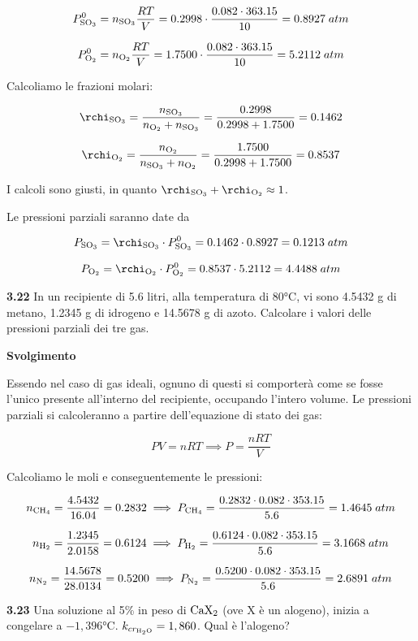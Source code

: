 $$P^0_{\rm SO_3}=n_{\rm SO_3} \displaystyle \frac{RT}{V}
=0.2998 \cdot \frac{0.082 \cdot 363.15}{10}
=0.8927\;atm$$

$$P^0_{\rm O_2}=n_{\rm O_2} \displaystyle \frac{RT}{V}
=1.7500 \cdot \frac{0.082 \cdot 363.15}{10}
=5.2112\;atm$$

Calcoliamo le frazioni molari:

$$\rchi_{\rm SO_3}=\frac{n_{\rm SO_3}}{n_{\rm O_2} + n_{\rm SO_3}}=\frac{0.2998}{0.2998 + 1.7500}=0.1462$$

$$\rchi_{\rm O_2}=\frac{n_{\rm O_2}}{n_{\rm SO_3} + n_{\rm O_2}}=\frac{1.7500}{0.2998 + 1.7500}=0.8537$$

I calcoli sono giusti, in quanto $\rchi_{\rm SO_3} + \rchi_{\rm O_2} \approx 1$.

Le pressioni parziali saranno date da

$$P_{\rm SO_3}=\rchi_{\rm SO_3} \cdot P^0_{\rm SO_3}
=0.1462 \cdot 0.8927=0.1213\;atm$$

$$P_{\rm O_2}=\rchi_{\rm O_2} \cdot P^0_{\rm O_2}
=0.8537 \cdot 5.2112=4.4488\;atm$$

\vspace{0.2cm}\textbf{3.22} In un recipiente di 5.6 litri, alla temperatura di 80°C, vi sono 4.5432 g di metano, 1.2345 g di idrogeno e 14.5678 g di azoto. Calcolare i valori delle pressioni parziali dei tre gas. 

\vspace{0.2cm}\large\textbf{Svolgimento}\normalsize

\vspace{0.2cm}Essendo nel caso di gas ideali, ognuno di questi si comporterà come se fosse l'unico presente all'interno del recipiente, occupando l'intero volume. Le pressioni parziali si calcoleranno a partire dell'equazione di stato dei gas:

$$PV=nRT
\implies
P=\frac{nRT}{V}$$

Calcoliamo le moli e conseguentemente le pressioni:

$$n_{\rm CH_4}=\frac{4.5432}{16.04}=0.2832
\implies
P_{\rm CH_4}=\frac{0.2832 \cdot 0.082 \cdot 353.15}{5.6}=1.4645\;atm$$

$$n_{\rm H_2}=\frac{1.2345}{2.0158}=0.6124
\implies
P_{\rm H_2}=\frac{0.6124 \cdot 0.082 \cdot 353.15}{5.6}=3.1668\;atm$$

$$n_{\rm N_2}=\frac{14.5678}{28.0134}=0.5200
\implies
P_{\rm N_2}=\frac{0.5200 \cdot 0.082 \cdot 353.15}{5.6}=2.6891\;atm$$

\vspace{0.2cm}\textbf{3.23} Una soluzione al 5\% in peso di $\rm CaX_2$ (ove X è un alogeno), inizia a congelare a $-1,396$°C. $k_{cr_{\rm H_2O}} = 1,860$. Qual è l'alogeno? 

